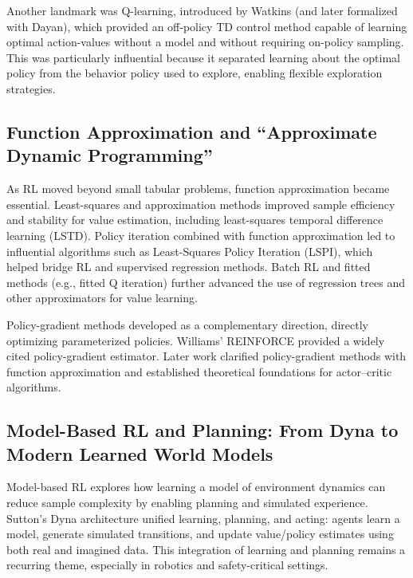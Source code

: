 \documentclass[10pt]{article}
\begin{document}
Another landmark was Q-learning, introduced by Watkins (and later formalized with Dayan), which provided an off-policy TD control method capable of learning optimal action-values without a model and without requiring on-policy sampling.\cite{watkins1989thesis,watkins1992qlearning}
This was particularly influential because it separated learning about the optimal policy from the behavior policy used to explore, enabling flexible exploration strategies.

\subsection{Function Approximation and ``Approximate Dynamic Programming''}

As RL moved beyond small tabular problems, function approximation became essential.
Least-squares and approximation methods improved sample efficiency and stability for value estimation, including least-squares temporal difference learning (LSTD).\cite{bradtke1996lstd}
Policy iteration combined with function approximation led to influential algorithms such as Least-Squares Policy Iteration (LSPI), which helped bridge RL and supervised regression methods.\cite{lagoudakis2003lspi}
Batch RL and fitted methods (e.g., fitted Q iteration) further advanced the use of regression trees and other approximators for value learning.\cite{ernst2005tree}

Policy-gradient methods developed as a complementary direction, directly optimizing parameterized policies.
Williams’ REINFORCE provided a widely cited policy-gradient estimator.\cite{williams1992reinforce}
Later work clarified policy-gradient methods with function approximation and established theoretical foundations for actor--critic algorithms.\cite{sutton2000policygradient,konda2000actorcritic}

\subsection{Model-Based RL and Planning: From Dyna to Modern Learned World Models}

Model-based RL explores how learning a model of environment dynamics can reduce sample complexity by enabling planning and simulated experience.
Sutton’s Dyna architecture unified learning, planning, and acting: agents learn a model, generate simulated transitions, and update value/policy estimates using both real and imagined data.\cite{sutton1990dyna}
This integration of learning and planning remains a recurring theme, especially in robotics and safety-critical settings.
\end{document}
